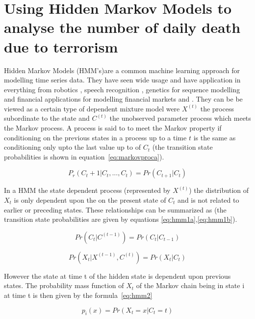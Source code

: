 \section{Using Hidden Markov Models to analyse the number of daily death due to terrorism}
Hidden Markov Models (HMM's)are a common machine learning approach for modelling time series data. They have seen wide usage and have application in everything from robotics \citep{ladd2005robotics}, speech recognition \citep{gales1998maximum}, genetics for sequence modelling \citep{sonnhammer1998pfam} and financial applications for modelling financial markets \citep{gales1998maximum} and \citep{park2009forecasting}. They can be be viewed as a certain type of dependent mixture model were $X^(t)$ the process subordinate to the state and $C^(t)$ the unobserved parameter process which meets the Markov process. A process is said to to meet the Markov property if conditioning on the previous states in a process up to a time $t$ is the same as conditioning only upto the last value up to of $C_t$ (the transition state probabilities is shown in equation~\ref{eq:markovproca}).

\begin{equation} P_r(C_t+1|C_t,...,C_t)=Pr(C_{t+1}|C_t)  \label{eq:markovproca}  \end{equation}

In a HMM the state dependent process (represented by $X^(t)$) the distribution of $X_t$ is only dependent upon the on the present state of $C_t$ and is not related to earlier or preceding states. These relationships can be summarized as (the transition state probabilities are given by equations \ref{eq:hmm1a},\ref{eq:hmm1b}).

\begin{equation} Pr(C_t|C^{(t-1)})=Pr(C_t|C_{t-1})  \label{eq:hmm1a}  \end{equation}

\begin{equation} Pr(X_t|X^{(t-1)},C^{(t)})=Pr(X_t|C_{t})   \label{eq:hmm1b}  \end{equation}


However the state at time t of the  hidden state is dependent upon previous states. The probability mass function of $X_t$ of the Markov chain being in state i at time t is then given by the formula~\ref{eq:hmm2} 

\begin{equation} p_{i}(x)=Pr(X_{t}=x|C_{t}=t)  \label{eq:hmm2}  \end{equation}

